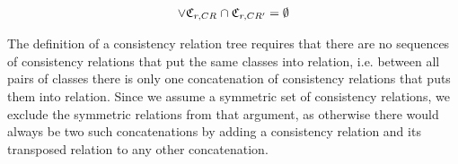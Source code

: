 \begin{definition}
\begin{align*}
        \lor \mathfrak{C}_{r,CR_{}} \cap
        \mathfrak{C}_{r,CR'_{}} = \emptyset
    \end{align*}
\end{definition}

The definition of a consistency relation tree requires that there are no sequences of consistency relations that put the same classes into relation, i.e. between all pairs of classes there is only one concatenation of consistency relations that puts them into relation.
Since we assume a symmetric set of consistency relations, we exclude the symmetric relations from that argument, as otherwise there would always be two such concatenations by adding a consistency relation and its transposed relation to any other concatenation.

